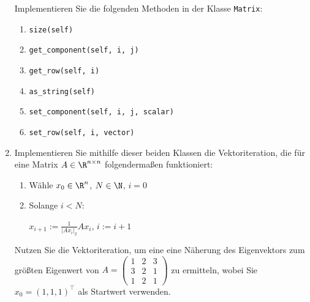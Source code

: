 \begin{enumerate}
	Implementieren Sie die folgenden Methoden in der Klasse \lstinline{Matrix}:
        \begin{multicols}{2}
            \begin{enumerate}
                \item \lstinline{size(self)}
                \item \lstinline{get_component(self, i, j)}
                \item \lstinline{get_row(self, i)}
                \item \lstinline{as_string(self)}
                \item \lstinline{set_component(self, i, j, scalar)}
                \item \lstinline{set_row(self, i, vector)}
            \end{enumerate}
        \end{multicols}


        
    \item
        Implementieren Sie mithilfe dieser beiden Klassen die Vektoriteration, die für eine Matrix $A \in \R^{n\times n}$ folgendermaßen funktioniert:
        \begin{enumerate}
            \item Wähle $x_0 \in \R^n$, $N \in \N$, $i=0$
            \item Solange $i < N\colon$ 
            
                \qquad $x_{i+1} := \frac{1}{|Ax_i|_2} Ax_i$, $i := i+1$
        \end{enumerate}
        Nutzen Sie die Vektoriteration, um eine eine Näherung des Eigenvektors zum größten Eigenwert von $A = \left(\begin{smallmatrix} 1 & 2 & 3 \\ 3 & 2 & 1 \\ 1 & 2 & 1 \end{smallmatrix}\right)$ zu ermitteln, wobei Sie $x_0 = (1,1,1)^\top$ als Startwert verwenden.
\end{enumerate}
